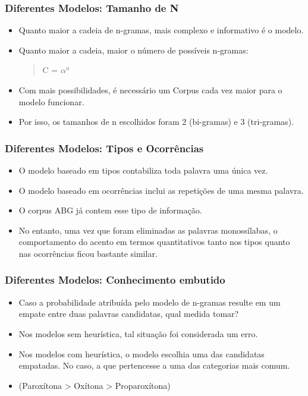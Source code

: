 \documentclass[xcolor=table]{beamer}
\begin{document}

	\begin{frame}
		\frametitle{Diferentes Modelos: Tamanho de N}
		\begin{itemize}
			\item Quanto maior a cadeia de n-gramas, mais complexo e informativo é o modelo.\\
			\item Quanto maior a cadeia, maior o número de possíveis n-gramas:\\
			\begin{quote}
				\centering C = $\alpha^n$ 
			\end{quote}
			\item Com mais possibilidades, é necessário um Corpus cada vez maior para o modelo funcionar.\\
			\item Por isso, os tamanhos de n escolhidos foram 2 (bi-gramas) e 3 (tri-gramas).\\
		\end{itemize}
	\end{frame}
	\begin{frame}
		\frametitle{Diferentes Modelos: Tipos e Ocorrências}
		\begin{itemize}
			\item O modelo baseado em tipos contabiliza toda palavra uma única vez.\\
			\item O modelo baseado em ocorrências inclui as repetições de uma mesma palavra.\\
			\item O corpus ABG já contem esse tipo de informação.\\
			\item No entanto, uma vez que foram eliminadas as palavras monossílabas, o comportamento do acento em termos quantitativos tanto nos tipos quanto nas ocorrências ficou bastante similar.\\
		\end{itemize}
	\end{frame}	
	\begin{frame}
		\frametitle{Diferentes Modelos: Conhecimento embutido}
		\begin{itemize}
			\item Caso a probabilidade atribuída pelo modelo de n-gramas resulte em um empate entre duas palavras candidatas, qual medida tomar?\\
			\item Nos modelos sem heurística, tal situação foi considerada um erro.\\
			\item Nos modelos com heurística, o modelo escolhia uma das candidatas empatadas. No caso, a que pertencesse a uma das categorias mais comum.\\
			\item (Paroxítona > Oxítona > Proparoxítona)\\
		\end{itemize}
	\end{frame}
\end{document}
